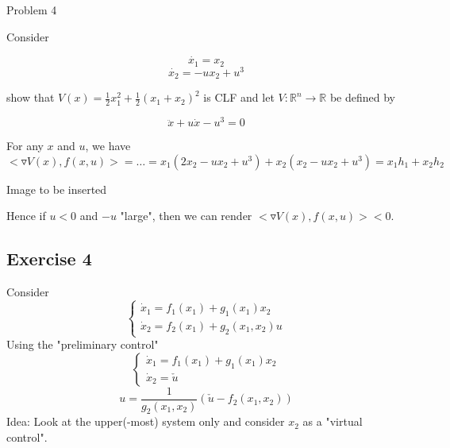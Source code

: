 Problem 4

Consider 

\begin{equation*}
\dot{x_1} = x_2
\end{equation*}
\begin{equation*}
\dot{x_2} = - ux_2 + u^3
\end{equation*}

show that $V(x) = \frac{1}{2} x_1^2 + \frac{1}{2}(x_1 +x_2)^2$ is CLF and let $V: \mathbb{R}^n \to \mathbb{R}$ be defined by

\begin{equation*}
\ddot{x} + u\dot{x} - u^3 = 0
\end{equation*}

For any $x$ and $u$, we have $<\triangledown V(x), f(x,u)> = \dots = x_1(2x_2 -ux_2 + u^3) + x_2(x_2 - ux_2 + u^3) = x_1h_1 + x_2h_2$

Image to be inserted

Hence if $u < 0$ and $-u$ "large", then we can render $<\triangledown V(x), f(x,u)> < 0$.

   
    \subsection{Exercise 4}
    
    Consider
    \begin{equation} \label{ex:4:theory:1}
    \left\{\begin{array}{ll}
        \dot x_1 = f_1(x_1)+g_1(x_1)x_2 \\
        \dot x_2 = f_2(x_1)+g_2(x_1,x_2)u
    \end{array} \right.
    \end{equation}
    Using the "preliminary control"
    \begin{equation} \label{ex:4:theory:2}
    \left\{\begin{array}{ll}
        \dot x_1 = f_1(x_1)+g_1(x_1)x_2 \\
        \dot x_2 = \check u
    \end{array} \right.
    \end{equation}
    $$u=\frac{1}{g_2(x_1,x_2)}(\check u - f_2(x_1,x_2))$$
    Idea: Look at the upper(-most) system only and consider $x_2$ as a "virtual control". \\
    
